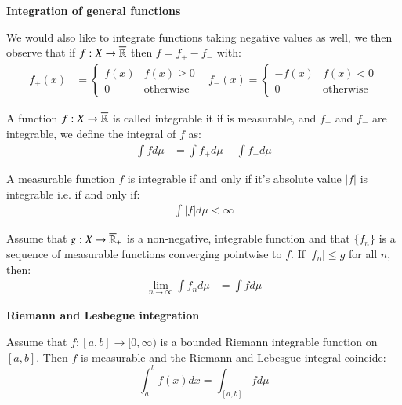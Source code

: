 \newpage 
\centerline{\textbf{Integration of general functions}}
We would also like to integrate functions taking negative values as well, we then observe that if $f:X \to \overline{\mathbb{R}}$ then $f = f_{+} - f_{-}$ with: 
\begin{align*}
f_{+}(x) &= \begin{cases}
      f(x) & \text{$f(x) \geq 0$}\\
      0 & \text{otherwise}
    \end{cases} 
\;\;\;    
f_{-}(x) = \begin{cases}
      -f(x) & \text{$f(x) < 0$}\\
      0 & \text{otherwise}
    \end{cases}      
\end{align*}

\begin{definition}
A function $f: X \to \overline{\mathbb{R}}$ is called integrable it if is measurable, and $f_{+}$ and $f_{-}$ are integrable, we define the integral of $f$ as: 
\begin{align*}
\int fd\mu &= \int f_{+}d\mu - \int f_{-}d\mu    
\end{align*}
\end{definition} 

\begin{lemma}
A measurable function $f$ is integrable if and only if it's absolute value $|f|$ is integrable i.e. if and only if: 
\begin{align*}
\int |f| d\mu < \infty    
\end{align*}
\end{lemma}

\begin{theorem}
Assume that $g:X \to \overline{\mathbb{R}}_{+}$ is a non-negative, integrable function and that $\{f_{n}\}$ is a sequence of measurable functions converging pointwise to $f$. 
If $|f_{n}| \leq g$ for all $n$, then: 
\begin{align*}
\lim\limits_{n \to \infty}\int f_{n}d\mu &= \int fd\mu    
\end{align*}
\end{theorem} 

\centerline{\textbf{Riemann and Lesbegue integration}}

\begin{theorem}
Assume that $f:[a,b]\to [0,\infty)$ is a bounded Riemann integrable function on $[a,b]$. Then $f$ is measurable and the Riemann and Lebesgue integral coincide:
\[
\int_{a}^{b}f(x)dx = \int_{[a,b]}fd\mu
\]
\end{theorem}

